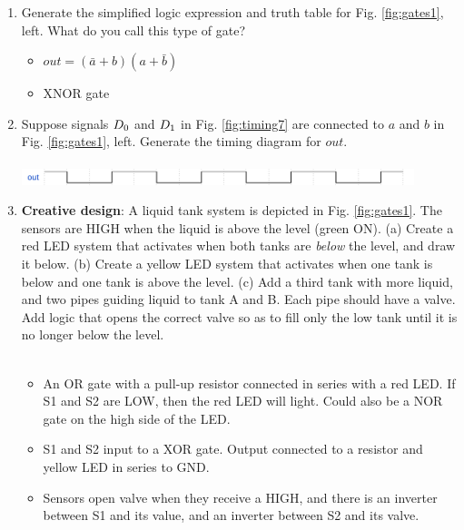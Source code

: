 \documentclass[10pt]{article}
\begin{document}
\begin{enumerate}
\item Generate the simplified logic expression and truth table for Fig. \ref{fig:gates1}, left.  What do you call this type of gate?
\begin{itemize}
\item $out = (\bar{a}+b)(a+\bar{b})$
\item XNOR gate
\end{itemize}
\item Suppose signals $D_{\rm 0}$ and $D_{\rm 1}$ in Fig. \ref{fig:timing7} are connected to $a$ and $b$ in Fig. \ref{fig:gates1}, left.  Generate the timing diagram for $out$. \\ \\ 
\includegraphics[width=0.9\textwidth]{timingExample8.pdf}
\item \textbf{Creative design}: A liquid tank system is depicted in Fig. \ref{fig:gates1}.  The sensors are HIGH when the liquid is above the level (green ON).  (a) Create a red LED system that activates when both tanks are \textit{below} the level, and draw it below.  (b) Create a yellow LED system that activates when one tank is below and one tank is above the level.  (c) Add a third tank with more liquid, and two pipes guiding liquid to tank A and B.  Each pipe should have a valve.  Add logic that opens the correct valve so as to fill only the low tank until it is no longer below the level.  \\ \\
\begin{itemize}
\item An OR gate with a pull-up resistor connected in series with a red LED.  If S1 and S2 are LOW, then the red LED will light.  Could also be a NOR gate on the high side of the LED.
\item S1 and S2 input to a XOR gate.  Output connected to a resistor and yellow LED in series to GND.
\item Sensors open valve when they receive a HIGH, and there is an inverter between S1 and its value, and an inverter between S2 and its valve.
\end{itemize}
\end{enumerate}

\clearpage
\end{document}
